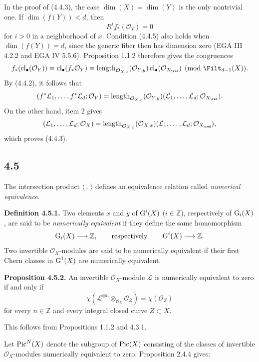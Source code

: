 In the proof of (4.4.3), the case $\dim(X)=\dim(Y)$ is the only nontrivial
one. If $\dim(f(Y))<d$, then
\begin{equation}\tag{4.4.5}
R^if_*(\mathcal O_Y)=0
\end{equation}
for $i>0$ in a neighborhood of $x$. Condition (4.4.5) also holds when
$\dim(f(Y))=d$, since the generic fiber then has dimension zero (EGA III
4.2.2 and EGA IV 5.5.6). Proposition 1.1.2 therefore gives the congruences
\[
f_*(\cl_\bullet(\mathcal O_Y))
\equiv\cl_\bullet(f_*\mathcal O_Y)
\equiv\operatorname{length}_{\mathcal O_{X,x}}(\mathcal O_{Y,y})
\cl_\bullet(\mathcal O_{X_{\red}})
\pmod{\Filt_{d-1}(X)}.
\]
By (4.4.2), it follows that
\[
(f^*\mathcal L_1,\ldots,f^*\mathcal L_d;\mathcal O_Y)
=\operatorname{length}_{\mathcal O_{X,x}}(\mathcal O_{Y,y})
(\mathcal L_1,\ldots,\mathcal L_d;\mathcal O_{X_{\red}}).
\]
On the other hand, item 2 gives
\[
(\mathcal L_1,\ldots,\mathcal L_d;\mathcal O_X)
=\operatorname{length}_{\mathcal O_{X,x}}(\mathcal O_{X,x})
(\mathcal L_1,\ldots,\mathcal L_d;\mathcal O_{X_{\red}}),
\]
which proves (4.4.3).

\subsection*{4.5}
The intersection product $\langle\, ,\,\rangle$ defines an equivalence
relation called \emph{numerical equivalence}.

\textbf{Definition 4.5.1.}
Two elements $x$ and $y$ of $\operatorname{G}^i(X)$ ($i\in\mathbb Z$), respectively of
$\operatorname{G}_i(X)$, are said to be \emph{numerically equivalent} if they define the
same homomorphism
\[
\operatorname{G}_i(X)\longrightarrow\mathbb Z,
\qquad\text{respectively}\qquad
\operatorname{G}^i(X)\longrightarrow\mathbb Z.
\]
Two invertible $\mathcal O_X$-modules are said to be numerically equivalent
if their first Chern classes in $\operatorname{G}^1(X)$ are numerically equivalent.

\textbf{Proposition 4.5.2.}
An invertible $\mathcal O_X$-module $\mathcal L$ is numerically equivalent to
zero if and only if
\begin{equation}\tag{4.5.3}
\chi(\mathcal L^{\otimes n}\otimes_{\mathcal O_X}\mathcal O_Z)
=\chi(\mathcal O_Z)
\end{equation}
for every $n\in\mathbb Z$ and every integral closed curve $Z\subset X$.

This follows from Propositions 1.1.2 and 4.3.1.

Let $\operatorname{Pic}^N(X)$ denote the subgroup of $\operatorname{Pic}(X)$ consisting of the classes of
invertible $\mathcal O_X$-modules numerically equivalent to zero.
Proposition 2.4.4 gives:


